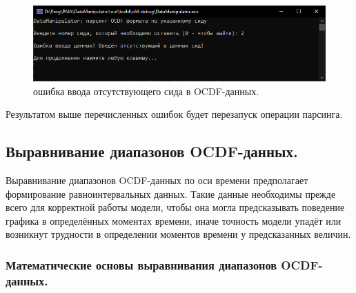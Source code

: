 {  \begin{figure}[H]
    \centering
    \includegraphics[width=\textwidth]{images/forDataManipulator/OCDFdataParsErrNotCID.png}
    \caption{ошибка ввода отсутствующего сида в OCDF-данных.} 
    \label{fig:OCDFdataParsErrnotcid}
  \end{figure}

  \par Результатом выше перечисленных ошибок будет перезапуск операции парсинга. 

}

\subsection{ \standartTitleFont
  Выравнивание диапазонов OCDF-данных.
} \label{subsec:OCDFRightIntervals}

{\standartFont

  \par Выравнивание диапазонов OCDF-данных по оси времени предполагает формирование равноинтервальных данных. Такие данные необходимы прежде всего для корректной работы модели, чтобы она могла предсказывать поведение графика в определённых моментах времени, иначе точность модели упадёт или возникнут трудности в определении моментов времени у предсказанных величин. 

  \par 
}

\subsubsection{ \standartTitleFont
  Математические основы выравнивания диапазонов OCDF-данных.
} \label{subsubsec:OCDFRIMath}

